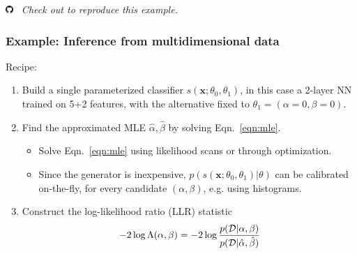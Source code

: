 \documentclass{beamer}
\let\oldcitep=\citep
\renewcommand\citep[1]{\hyperlink{#1}{\oldcitep{#1}}}
\begin{document}
\begin{frame}
\vspace{2em}

\centering
\includegraphics[height=0.8em]{figures/github.png}~ {\it \small Check out \citep{carl} to reproduce this example.}
\vspace{-1em}

\end{frame}

\begin{frame}
    \frametitle{Example: Inference from multidimensional data}

    Recipe:

    \begin{enumerate}
        \item Build a single parameterized classifier $s(\mathbf{x}; \theta_0, \theta_1)$,
        in this case a 2-layer NN trained on 5+2 features, with the alternative fixed to $\theta_1=(\alpha=0, \beta=0)$.

        \item Find the approximated MLE $\hat \alpha, \hat \beta$ by solving Eqn.~\ref{eqn:mle}.
            \begin{itemize}
                \item Solve Eqn.~\ref{eqn:mle} using likelihood scans or through optimization.
                \item Since the generator is inexpensive, $p(s(\mathbf{x}; \theta_0, \theta_1)|\theta)$ can be calibrated on-the-fly, for every candidate $(\alpha,\beta)$, e.g. using histograms.
            \end{itemize}

        \item Construct the log-likelihood ratio (LLR) statistic
        \begin{equation*}
            -2 \log \Lambda(\alpha, \beta ) = -2 \log \frac{p({\cal D} | \alpha, \beta)}{  p({\cal D} | \hat \alpha, \hat \beta) }
        \end{equation*}

    \end{enumerate}

\end{frame}
\end{document}
